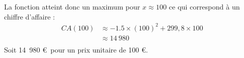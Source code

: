 {\begin{enumerate}
	\begin{center}
	\end{center}
	
	La fonction atteint donc un maximum pour $x \approx 100$ ce qui correspond à un chiffre d'affaire :
	\begin{align*}
	CA(100) & \approx -1.5 \times (100)^2 + 299,8 \times 100  \\
	& \approx 14~980 \\
	\end{align*}
	Soit 14~980 \euro~pour un prix unitaire de 100 \euro.
 \end{enumerate}
}

